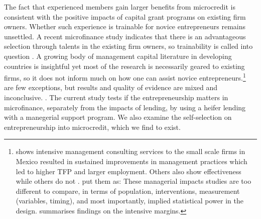 	The fact that experienced members gain larger benefits from microcredit is consistent with the positive impacts of capital grant programs on existing firm owners. Whether such experience is trainable for novice entrepreneurs remains unsettled. A recent microfinance study indicates that there is an advantageous selection through talents in the existing firm owners, so trainability is called into question \citep{Banerjee2019MFPovertyTrap}. A growing body of management capital literature in developing countries is insightful yet most of the research is necessarily geared to existing firms, so it does not inform much on how one can assist novice entrepreneurs.\footnote{\citet{BruhnKarlanSchoar2018} shows intensive management consulting services to the small scale firms in Mexico resulted in sustained improvements in management practices which led to higher TFP and larger employment. Others also show effectiveness \citep{Calderon2011, Berge2012, Bloometal2013} while others do not \citep{Bruhn2012, KarlanKnightUdry2015}. \citet{MckenzieWoodruff2013} put them as: These managerial impacts studies are too different to compare, in terms of population, interventions, measurement (variables, timing), and most importantly, implied statistical power in the design. \citet{McKenzie2021} summarises findings on the intensive margins. } \citet{KarlanValvidia2011, BruhnZia2011, Argent2014} are few exceptions, but results and quality of evidence are mixed and inconclusive.  \citep{Blattman2014, Blattmanetal2016}. The current study tests if the entrepreneurship matters in microfinance, separately from the impacts of lending, by using a heifer lending with a manegerial support program. We also examine the self-selection on entrepreneurship into microcredit, which we find to exist.%



